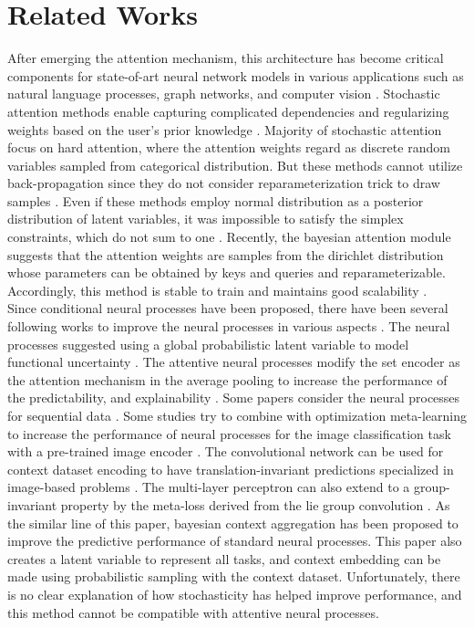 \section{Related Works}

After emerging the attention mechanism, this architecture has become critical components for state-of-art neural network models in various applications such as natural language processes, graph networks, and computer vision \cite{Vaswani2017attention}. Stochastic attention methods enable capturing complicated dependencies and regularizing weights based on the user's prior knowledge \cite{shankar2018posterior, lawson2018learning, bahuleyan2018variational, Deng2018Latent}. Majority of stochastic attention focus on hard attention, where the attention weights regard as discrete random variables sampled from categorical distribution. But these methods cannot utilize back-propagation since they do not consider reparameterization trick to draw samples \cite{shankar2018posterior, lawson2018learning, Deng2018Latent}. Even if these methods employ normal distribution as a posterior distribution of latent variables, it was impossible to satisfy the simplex constraints, which do not sum to one \cite{bahuleyan2018variational}. Recently, the bayesian attention module suggests that the attention weights are samples from the dirichlet distribution whose parameters can be obtained by keys and queries and reparameterizable. Accordingly, this method is stable to train and maintains good scalability \cite{Fan2020bayesian}. \\ 
Since conditional neural processes have been proposed, there have been several following works to improve the neural processes in various aspects \cite{garnelo2018conditional}. The neural processes suggested using a global probabilistic latent variable to model functional uncertainty \cite{garnelo2018neural}. The attentive neural processes modify the set encoder as the attention mechanism in the average pooling to increase the performance of the predictability, and explainability \cite{kim2019attentive}. Some papers consider the neural processes for sequential data \cite{yoon2020robustifying, Singh2019Sequential}. Some studies try to combine with optimization meta-learning to increase the performance of neural processes for the image classification task with a pre-trained image encoder \cite{rusu2018meta, xu2020metafun}. The convolutional network can be used for context dataset encoding to have translation-invariant predictions specialized in image-based problems \cite{gordon2019convolutional, Foong2020Meta}. The multi-layer perceptron can also extend to a group-invariant property by the meta-loss derived from the lie group convolution \cite{kawano2021group}. As the similar line of this paper, bayesian context aggregation has been proposed to improve the predictive performance of standard neural processes. \cite{Volpp2021bayesian} This paper also creates a latent variable to represent all tasks, and context embedding can be made using probabilistic sampling with the context dataset. Unfortunately, there is no clear explanation of how stochasticity has helped improve performance, and this method cannot be compatible with attentive neural processes. \\
